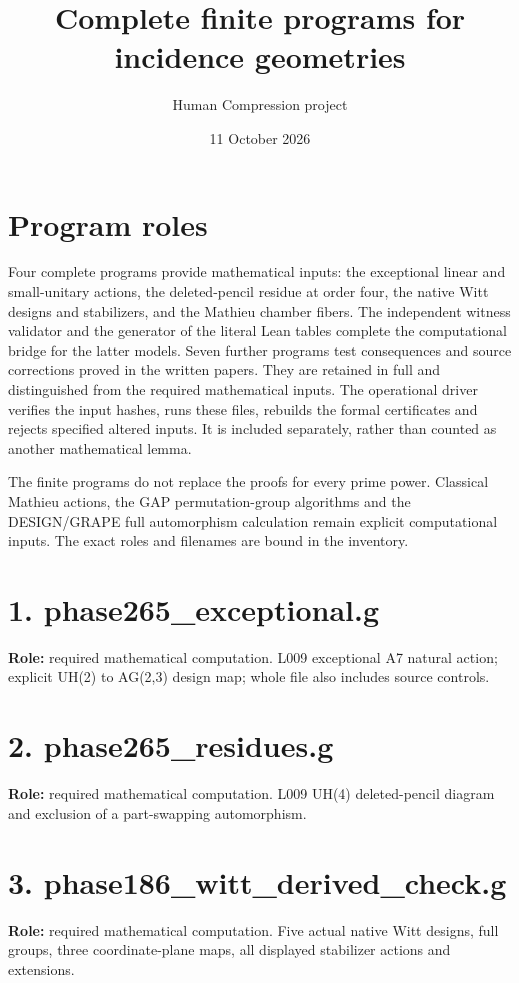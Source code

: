\documentclass[
  11pt,
  a4paper,
]{article}
\title{Complete finite programs for incidence geometries}
\author{Human Compression project}
\date{11 October 2026}
\renewcommand{\texttt}[1]{{\ttfamily\seqsplit{#1}}}
\begin{document}
\maketitle
\section{Program roles}
Four complete programs provide mathematical inputs: the exceptional
linear and small-unitary actions, the deleted-pencil residue at order
four, the native Witt designs and stabilizers, and the Mathieu chamber
fibers. The independent witness validator and the generator of the
literal Lean tables complete the computational bridge for the latter
models. Seven further programs test consequences and source corrections
proved in the written papers. They are retained in full and distinguished
from the required mathematical inputs. The operational driver
\texttt{check.py} verifies the input hashes, runs these files, rebuilds
the formal certificates and rejects specified altered inputs. It is
included separately, rather than counted as another mathematical lemma.

The finite programs do not replace the proofs for every prime power.
Classical Mathieu actions, the GAP permutation-group algorithms and the
DESIGN/GRAPE full automorphism calculation remain explicit computational
inputs. The exact roles and filenames are bound in the inventory.
\section{1. phase265\_exceptional.g}
\textbf{Role:} required mathematical computation. L009 exceptional A7 natural action; explicit UH(2) to AG(2,3) design map; whole file also includes source controls.

\section{2. phase265\_residues.g}
\textbf{Role:} required mathematical computation. L009 UH(4) deleted-pencil diagram and exclusion of a part-swapping automorphism.

\section{3. phase186\_witt\_derived\_check.g}
\textbf{Role:} required mathematical computation. Five actual native Witt designs, full groups, three coordinate-plane maps, all displayed stabilizer actions and extensions.
\end{document}
